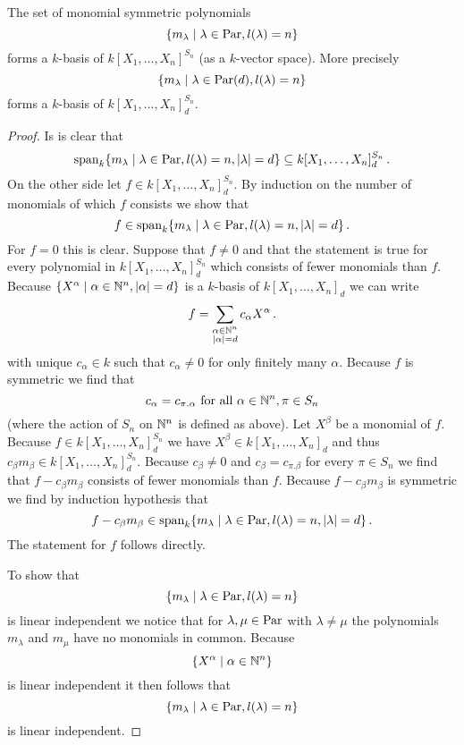 \begin{lem}
  The set of monomial symmetric polynomials
  \[
    \{
      m_\lambda
    \mid
      \lambda \in \operatorname{Par},
      l(\lambda) = n
    \}
  \]
  forms a $k$-basis of $k[X_1, \dotsc, X_n]^{S_n}$ (as a $k$-vector space). More precisely
  \[
    \{
      m_\lambda
    \mid
      \lambda \in \operatorname{Par}(d),
      l(\lambda) = n
    \}
  \]
  forms a $k$-basis of $k[X_1, \dotsc, X_n]^{S_n}_d$.
\end{lem}
\begin{proof}
  Is is clear that
  \[
            \operatorname{span}_k \{
                        m_\lambda
                      \mid
                        \lambda \in \operatorname{Par},
                        l(\lambda) = n,
                        |\lambda| = d
                      \}
  \subseteq k[X_1, \dotsc, X_n]^{S_n}_d \,.
  \]
  On the other side let $f \in k[X_1, \dotsc, X_n]^{S_n}_d$. By induction on the number of monomials of which $f$ consists we show that
  \[
        f
    \in \operatorname{span}_k  \{
                    m_\lambda
                  \mid
                    \lambda \in \operatorname{Par},
                    l(\lambda) = n,
                    |\lambda| = d
                  \} \,.
  \]
  For $f = 0$ this is clear.
  Suppose that $f \neq 0$ and that the statement is true for every polynomial in $k[X_1, \dotsc, X_n]^{S_n}_d$ which consists of fewer monomials than $f$.
  Because $\{X^\alpha \mid \alpha \in \mathbb{N}^n, |\alpha| = d \}$ is a $k$-basis of $k[X_1, \dotsc, X_n]_d$ we can write
  \[
      f
    = \sum_{\substack{\alpha \in \mathbb{N}^n \\ |\alpha| = d}} c_\alpha X^\alpha \,.
  \]
  with unique $c_\alpha \in k$ such that $c_\alpha \neq 0$ for only finitely many $\alpha$.
  Because $f$ is symmetric we find that
  \[
      c_\alpha
    = c_{\pi.\alpha}
    \text{ for all }
    \alpha \in \mathbb{N}^n,
    \pi \in S_n
  \]
  (where the action of $S_n$ on $\mathbb{N}^n$ is defined as above).
  Let $X^\beta$ be a monomial of $f$.
  Because $f \in k[X_1, \dotsc, X_n]^{S_n}_d$ we have $X^\beta \in k[X_1, \dotsc, X_n]_d$ and thus $c_\beta m_\beta \in k[X_1, \dotsc, X_n]^{S_n}_d$.
  Because $c_\beta \neq 0$ and $c_\beta = c_{\pi.\beta}$ for every $\pi \in S_n$ we find that $f - c_{\beta} m_\beta$ consists of fewer monomials than $f$.
  Because $f-c_{\beta} m_\beta$ is symmetric we find by induction hypothesis that
  \[
        f - c_{\beta} m_\beta
    \in \operatorname{span}_k  \{
                    m_\lambda
                  \mid
                    \lambda \in \operatorname{Par},
                    l(\lambda) = n,
                    |\lambda| = d
                  \} \,.
  \]
  The statement for $f$ follows directly.
  
  To show that
  \[
    \{
      m_\lambda
    \mid
      \lambda \in \operatorname{Par},
      l(\lambda) = n
    \}
  \]
  is linear independent we notice that for $\lambda, \mu \in \operatorname{Par}$ with $\lambda \neq \mu$ the polynomials $m_\lambda$ and $m_\mu$ have no monomials in common. Because
  \[
    \{
      X^\alpha
    \mid
      \alpha \in \mathbb{N}^n
    \}
  \]
  is linear independent it then follows that
  \[
    \{
      m_\lambda
    \mid
      \lambda \in \operatorname{Par},
      l(\lambda) = n
    \}
  \]
  is linear independent.
\end{proof}


